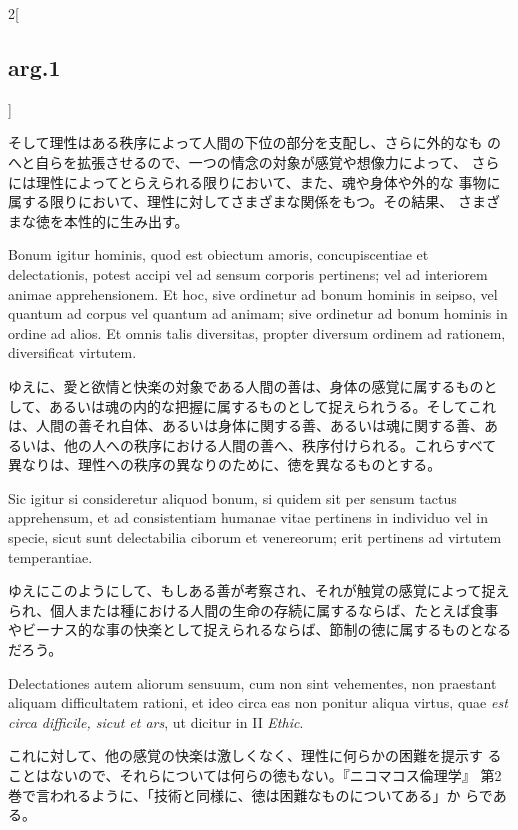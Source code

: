 \documentclass[paper=a4paper,fontsize=10pt,jafontsize=9pt,titlepage]{jlreq}
\begin{document}
\begin{paracol}{2}[\subsection{arg.1}]
\switchcolumn

そして理性はある秩序によって人間の下位の部分を支配し、さらに外的なも
 のへと自らを拡張させるので、一つの情念の対象が感覚や想像力によって、
 さらには理性によってとらえられる限りにおいて、また、魂や身体や外的な
 事物に属する限りにおいて、理性に対してさまざまな関係をもつ。その結果、
 さまざまな徳を本性的に生み出す。

\switchcolumn*

Bonum igitur hominis, quod est obiectum amoris, concupiscentiae et
 delectationis, potest accipi vel ad sensum corporis pertinens; vel ad
 interiorem animae apprehensionem. Et hoc, sive ordinetur ad bonum
 hominis in seipso, vel quantum ad corpus vel quantum ad animam; sive
 ordinetur ad bonum hominis in ordine ad alios. Et omnis talis
 diversitas, propter diversum ordinem ad rationem, diversificat
 virtutem.

\switchcolumn

ゆえに、愛と欲情と快楽の対象である人間の善は、身体の感覚に属するものと
して、あるいは魂の内的な把握に属するものとして捉えられうる。そしてこれ
は、人間の善それ自体、あるいは身体に関する善、あるいは魂に関する善、あ
るいは、他の人への秩序における人間の善へ、秩序付けられる。これらすべて
異なりは、理性への秩序の異なりのために、徳を異なるものとする。

\switchcolumn*

Sic igitur si consideretur aliquod bonum, si quidem sit per sensum
 tactus apprehensum, et ad consistentiam humanae vitae pertinens in
 individuo vel in specie, sicut sunt delectabilia ciborum et
 venereorum; erit pertinens ad virtutem temperantiae.

\switchcolumn

ゆえにこのようにして、もしある善が考察され、それが触覚の感覚によって捉えられ、個人または種における人間の生命の存続に属するならば、たとえば食事やビーナス的な事の快楽として捉えられるならば、節制の徳に属するものとなるだろう。

\switchcolumn*

Delectationes autem aliorum sensuum, cum non sint vehementes, non
 praestant aliquam difficultatem rationi, et ideo circa eas non
 ponitur aliqua virtus, quae {\itshape est circa difficile, sicut et
 ars}, ut dicitur in II {\itshape Ethic}.

\switchcolumn

これに対して、他の感覚の快楽は激しくなく、理性に何らかの困難を提示す
 ることはないので、それらについては何らの徳もない。『ニコマコス倫理学』
 第2巻で言われるように、「技術と同様に、徳は困難なものについてある」か
 らである。


\end{paracol}
\end{document}
